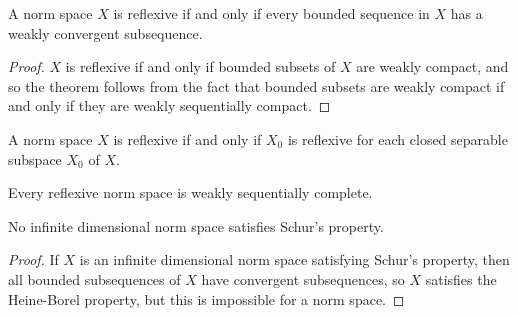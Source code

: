 \begin{corollary}
    A norm space $X$ is reflexive if and only if every bounded sequence in $X$ has a weakly convergent subsequence.
\end{corollary}
\begin{proof}
    $X$ is reflexive if and only if bounded subsets of $X$ are weakly compact, and so the theorem follows from the fact that bounded subsets are weakly compact if and only if they are weakly sequentially compact.
\end{proof}

\begin{corollary}
    A norm space $X$ is reflexive if and only if $X_0$ is reflexive for each closed separable subspace $X_0$ of $X$.
\end{corollary}

\begin{corollary}
    Every reflexive norm space is weakly sequentially complete.
\end{corollary}

\begin{corollary}
    No infinite dimensional norm space satisfies Schur's property.
\end{corollary}
\begin{proof}
    If $X$ is an infinite dimensional norm space satisfying Schur's property, then all bounded subsequences of $X$ have convergent subsequences, so $X$ satisfies the Heine-Borel property, but this is impossible for a norm space.
\end{proof}


